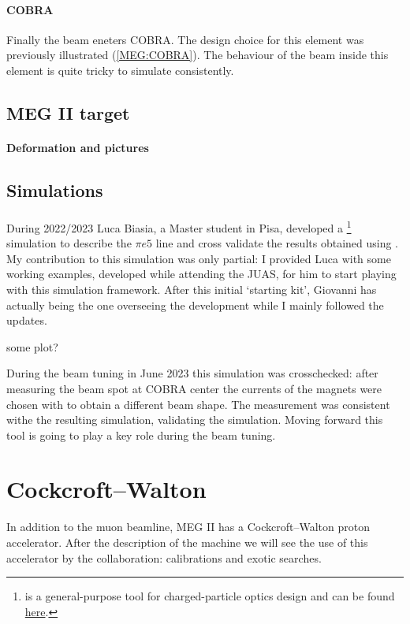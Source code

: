 \begin{refsection}
\paragraph{COBRA} Finally the beam eneters COBRA. 
The design choice for this element was previously illustrated (\ref{MEG:COBRA}). 
The behaviour of the beam inside this element is quite tricky to simulate consistently.
\subsection{MEG II target}
\paragraph{Deformation and pictures}
\subsection{Simulations}
\paragraph{\gfb}
\paragraph{\madx} During 2022/2023 Luca Biasia, a Master student in Pisa, developed a \madx\footnote{\madx is a general-purpose tool for charged-particle optics design and can be found \href{http://madx.web.cern.ch/madx/}{here}.} simulation to describe the $\pi e5$ line and cross validate the results obtained using \gfb. 
My contribution to this simulation was only partial: I provided Luca with some working \madx examples, developed while attending the JUAS, for him to start playing with this simulation framework. 
After this initial `starting kit', Giovanni has actually being the one overseeing the development while I mainly followed the updates. 

some plot?

During the beam tuning in June 2023 this simulation was crosschecked: after measuring the beam spot at COBRA center the currents of the magnets were chosen with \madx to obtain a different beam shape. 
The measurement was consistent withe the resulting simulation, validating the  simulation.
Moving forward this tool is going to play a key role during the beam tuning.

\section{Cockcroft–Walton}
In addition to the muon beamline, MEG II has a Cockcroft–Walton proton accelerator. 
After the description of the machine we will see the use of this accelerator by the collaboration: calibrations and exotic searches. 


\end{refsection}
